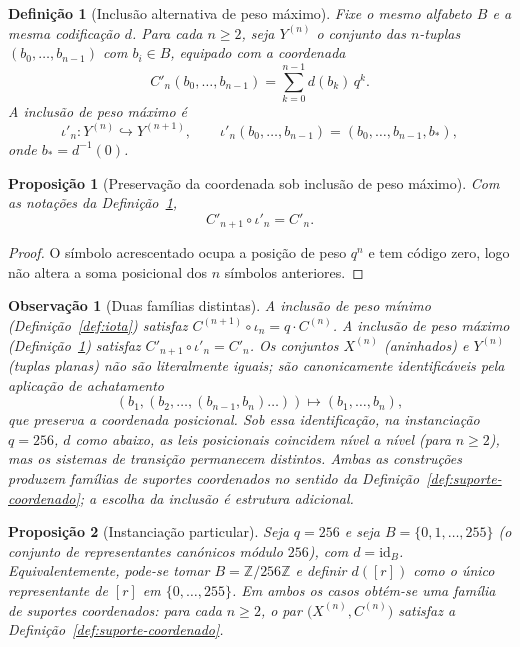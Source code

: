 \documentclass[11pt,a4paper]{article}
\newtheorem{definicao}{Definição}
\newtheorem{proposicao}{Proposição}
\newtheorem{observacao}{Observação}
\begin{document}
\begin{definicao}[Inclusão alternativa de peso máximo]
\label{def:iota-peso-max}
Fixe o mesmo alfabeto \(B\) e a mesma codificação \(d\).
Para cada \(n\ge 2\), seja \(Y^{(n)}\) o conjunto das \(n\)-tuplas
\((b_0,\dots,b_{n-1})\) com \(b_i\in B\), equipado com a coordenada
\[
C'_n(b_0,\dots,b_{n-1})=\sum_{k=0}^{n-1}d(b_k)\,q^k.
\]
A \emph{inclusão de peso máximo} é
\[
\iota'_n\colon Y^{(n)}\hookrightarrow Y^{(n+1)},
\qquad
\iota'_n(b_0,\dots,b_{n-1})=(b_0,\dots,b_{n-1},b_*),
\]
onde \(b_*=d^{-1}(0)\).
\end{definicao}

\begin{proposicao}[Preservação da coordenada sob inclusão de peso máximo]
\label{prop:peso-max}
Com as notações da Definição~\ref{def:iota-peso-max},
\[
C'_{n+1}\circ\iota'_n = C'_n.
\]
\end{proposicao}

\begin{proof}
O símbolo acrescentado ocupa a posição de peso \(q^n\) e tem código zero, logo
não altera a soma posicional dos \(n\) símbolos anteriores.
\end{proof}

\begin{observacao}[Duas famílias distintas]
\label{obs:comparacao-familias}
A inclusão de peso mínimo (Definição~\ref{def:iota}) satisfaz
\(C^{(n+1)}\circ\iota_n=q\cdot C^{(n)}\).
A inclusão de peso máximo (Definição~\ref{def:iota-peso-max}) satisfaz
\(C'_{n+1}\circ\iota'_n=C'_n\).
Os conjuntos \(X^{(n)}\) (aninhados) e \(Y^{(n)}\) (tuplas planas) não são
literalmente iguais; são canonicamente identificáveis pela aplicação de
achatamento
\[
(b_1,(b_2,\dots,(b_{n-1},b_n)\dots))\longmapsto(b_1,\dots,b_n),
\]
que preserva a coordenada posicional.
Sob essa identificação, na instanciação \(q=256\), \(d\) como abaixo, as leis
posicionais coincidem nível a nível (para \(n\ge 2\)), mas os sistemas de
transição permanecem distintos.
Ambas as construções produzem famílias de suportes coordenados no sentido da
Definição~\ref{def:suporte-coordenado}; a escolha da inclusão é estrutura
adicional.
\end{observacao}

\begin{proposicao}[Instanciação particular]
\label{prop:instanciacao-bytes}
Seja \(q=256\) e seja \(B=\{0,1,\dots,255\}\) (o conjunto de representantes
canónicos módulo \(256\)), com \(d=\mathrm{id}_B\).
Equivalentemente, pode-se tomar \(B=\mathbb Z/256\mathbb Z\) e definir
\(d([r])\) como o único representante de \([r]\) em \(\{0,\dots,255\}\).
Em ambos os casos obtém-se uma família de suportes coordenados: para cada
\(n\ge 2\), o par \(\bigl(X^{(n)},C^{(n)}\bigr)\) satisfaz a
Definição~\ref{def:suporte-coordenado}.
\end{proposicao}
\end{document}
